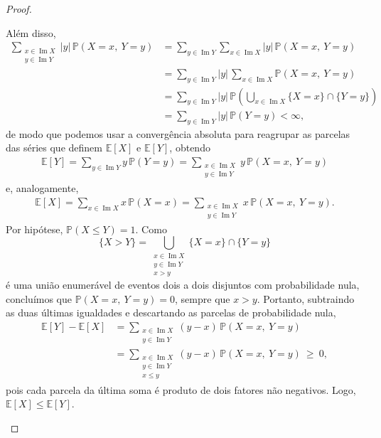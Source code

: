 \documentclass[12pt,portuguese]{article}
\theoremstyle{definition}
\begin{document}
\begin{proof}
\begin{enumerate}[label=(\alph*)]
Além disso,
\begin{align*}
\sum_{\substack{x \in \operatorname{Im} X\\ y \in \operatorname{Im} Y}}
|y|\,\mathbb{P}(X=x,\ Y=y)
&=
\sum_{y \in \operatorname{Im} Y}
\sum_{x \in \operatorname{Im} X} |y|\,\mathbb{P}(X=x,\ Y=y)
\\[0.3cm]
&=
\sum_{y \in \operatorname{Im} Y}|y|\,
\sum_{x \in \operatorname{Im} X} \mathbb{P}(X=x,\ Y=y)
\\[0.3cm]
&=
\sum_{y \in \operatorname{Im} Y}|y|\,
\mathbb{P}\left( \bigcup_{x \in \operatorname{Im} X } \{X=x\}\cap \{Y=y\} \right)
\\[0.3cm]
&=
\sum_{y \in \operatorname{Im} Y} |y|\,\mathbb{P}(Y=y)
<
\infty,
\end{align*}
de modo que podemos usar a convergência absoluta para reagrupar as parcelas das séries que definem
$\mathbb{E}[X]$ e $\mathbb{E}[Y]$, obtendo
\begin{align*}
\mathbb{E}[Y]
=
\sum_{y \in \operatorname{Im} Y} y\,\mathbb{P}(Y=y)
=
\sum_{\substack{x \in \operatorname{Im} X\\ y \in \operatorname{Im} Y}}
y\,\mathbb{P}(X=x,\ Y=y)
\end{align*}
e, analogamente,
\begin{align*}
\mathbb{E}[X]
=
\sum_{x \in \operatorname{Im} X} x\,\mathbb{P}(X=x)
=
\sum_{\substack{x \in \operatorname{Im} X\\ y \in \operatorname{Im} Y}}
x\,\mathbb{P}(X=x,\ Y=y).
\end{align*}
Por hipótese, $\mathbb{P}(X\leqslant Y)=1$. Como
\[
\{X>Y\}=\bigcup_{\substack{x \in \operatorname{Im} X\\ y \in \operatorname{Im} Y\\ x>y}}
\{X=x\}\cap\{Y=y\}
\]
é uma união enumerável de eventos dois a dois disjuntos com probabilidade nula, concluímos que
$\mathbb{P}(X=x,\ Y=y)=0$, sempre que $x>y$. Portanto, subtraindo as duas últimas igualdades e
descartando as parcelas de probabilidade nula,
\begin{align*}
\mathbb{E}[Y]-\mathbb{E}[X]
&=
\sum_{\substack{x \in \operatorname{Im} X\\ y \in \operatorname{Im} Y}}
(y-x)\,\mathbb{P}(X=x,\ Y=y)
\\[0.4cm]
&=
\sum_{\substack{x \in \operatorname{Im} X\\ y \in \operatorname{Im} Y\\ x\leqslant y}}
(y-x)\,\mathbb{P}(X=x,\ Y=y)
\ \geqslant\ 0,
\end{align*}
pois cada parcela da última soma é produto de dois fatores não negativos. Logo,
$\mathbb{E}[X]\leqslant\mathbb{E}[Y]$.
\qedhere
\end{enumerate}
\end{proof}
\end{document}
